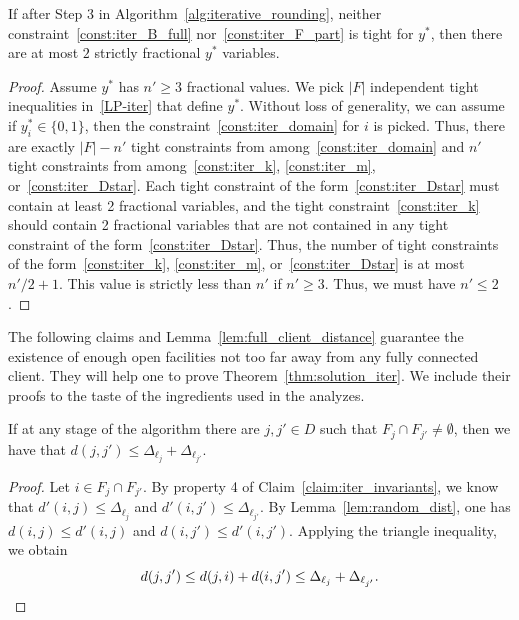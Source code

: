 \begin{lemma} \label{lem:iter_almost_integral}
If after Step 3 in Algorithm~\ref{alg:iterative_rounding}, neither constraint~\eqref{const:iter_B_full} nor~\eqref{const:iter_F_part} is tight for $y^*$, then there are at most $2$ strictly fractional $y^*$ variables.
\end{lemma}

\begin{proof}
Assume $y^*$ has $n' \ge 3$ fractional values. We pick $|F|$ independent tight inequalities in~\eqref{LP-iter} that define $y^*$. Without loss of generality, we can assume if $y^*_i \in \{0,1\}$, then the constraint~\eqref{const:iter_domain} for $i$ is picked. Thus, there are exactly $|F|-n'$ tight constraints from among~\eqref{const:iter_domain} and $n'$ tight constraints from among~\eqref{const:iter_k}, \eqref{const:iter_m}, or~\eqref{const:iter_Dstar}.
Each tight constraint of the form~\eqref{const:iter_Dstar} must contain at least 2 fractional variables, and the tight constraint~\eqref{const:iter_k} should contain 2 fractional variables that are not contained in any tight constraint of the form~\eqref{const:iter_Dstar}. Thus, the number of tight constraints of the form~\eqref{const:iter_k}, \eqref{const:iter_m}, or~\eqref{const:iter_Dstar} is at most $n'/2+1$. This value is strictly less than $n'$ if $n' \ge 3$. Thus, we must have $n' \le 2$.
\end{proof}

The following claims and Lemma~\ref{lem:full_client_distance} guarantee the existence of enough open facilities not too far away from any fully connected client. They will help one to prove Theorem~\ref{thm:solution_iter}. We include their proofs to the taste of the ingredients used in the analyzes.

\begin{claim} \label{claim:intersect_distance}
If at any stage of the algorithm there are $j,j' \in D$ such that $F_j \cap F_{j'} \neq \emptyset$, then we have that ${d(j, j') \le \Delta_{\ell_j} + \Delta_{\ell_{j'}}}$.
\end{claim}

\begin{proof}
Let $i \in F_j \cap F_{j'}$. By property 4 of Claim~\ref{claim:iter_invariants}, we know that $d'(i,j) \le \Delta_{\ell_j}$ and $d'(i,j') \le \Delta_{\ell_{j'}}$. By Lemma~\ref{lem:random_dist}, one has $d(i,j) \le d'(i,j)$ and $d(i,j') \le d'(i,j')$. Applying the triangle inequality, we obtain
\[ d(j, j') \le d(j, i) + d(i, j') \le \Delta_{\ell_j} + \Delta_{\ell_{j'}}. \qedhere \]
\end{proof}


